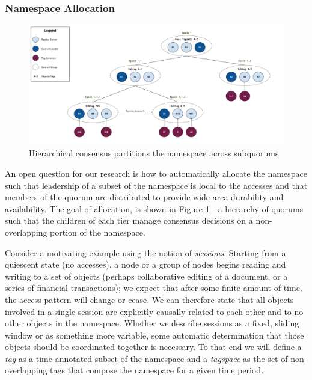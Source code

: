 \documentclass{article}
\begin{document}
\subsubsection{Namespace Allocation}
\label{sec:namespace_allocation}

\begin{figure}
    \centering
        \includegraphics[width=.9\textwidth]{figures/hierarchical}
        \caption{Hierarchical consensus partitions the namespace across subquorums}
        \label{fig:hierarchical}
\end{figure}

An open question for our research is how to automatically allocate the namespace such that leadership of a subset of the namespace is local to the accesses and that members of the quorum are distributed to provide wide area durability and availability. The goal of allocation, is shown in Figure \ref{fig:hierarchical} - a hierarchy of quorums such that the children of each tier manage consensus decisions on a non-overlapping portion of the namespace.

Consider a motivating example using the notion of \textit{sessions}. Starting from a quiescent state (no accesses), a node or a group of nodes begins reading and writing to a set of objects (perhaps collaborative editing of a document, or a series of financial transactions); we expect that after some finite amount of time, the access pattern will change or cease. We can therefore state that all objects involved in a single session are explicitly causally related to each other and to no other objects in the namespace. Whether we describe sessions as a fixed, sliding window or as something more variable, some automatic determination that those objects should be coordinated together is necessary. To that end we will define a \textit{tag} as a time-annotated subset of the namespace and a \textit{tagspace} as the set of non-overlapping tags that compose the namespace for a given time period.
\end{document}
